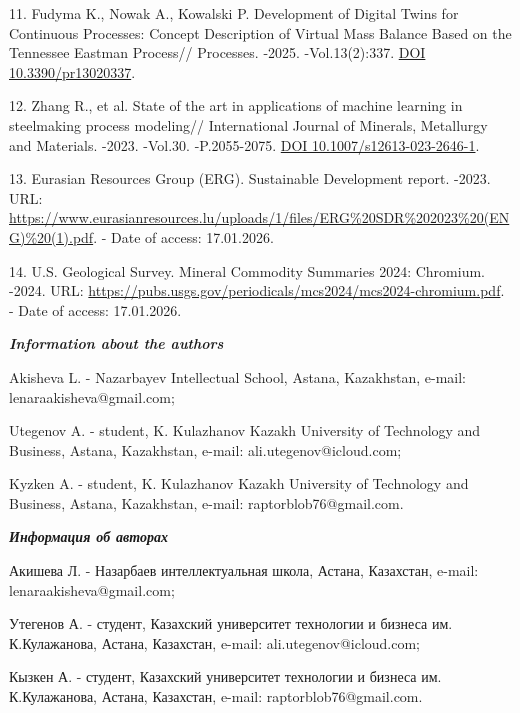 \begin{refs}
11. Fudyma K., Nowak A., Kowalski P. Development of Digital Twins for
Continuous Processes: Concept Description of Virtual Mass Balance Based
on the Tennessee Eastman Process// Processes. -2025. -Vol.13(2):337.
\href{https://doi.org/10.3390/pr13020337}{DOI 10.3390/pr13020337}.

12. Zhang R., et al. State of the art in applications of machine
learning in steelmaking process modeling// International Journal of
Minerals, Metallurgy and Materials. -2023. -Vol.30. -P.2055-2075.
\href{https://doi.org/10.1007/s12613-023-2646-1}{DOI
10.1007/s12613-023-2646-1}.

13. Eurasian Resources Group (ERG). Sustainable Development report.
-2023. URL:
\url{https://www.eurasianresources.lu/uploads/1/files/ERG\%20SDR\%202023\%20(ENG)\%20(1).pdf}.
- Date of access: 17.01.2026.

14. U.S. Geological Survey. Mineral Commodity Summaries 2024: Chromium.
-2024. URL:
\url{https://pubs.usgs.gov/periodicals/mcs2024/mcs2024-chromium.pdf}. -
Date of access: 17.01.2026.
\end{refs}

\begin{info}
\hspace{1em}\emph{{\bfseries Information about the authors}}

Akisheva L. - Nazarbayev Intellectual School, Astana, Kazakhstan,
e-mail: lenaraakisheva@gmail.com;

Utegenov A. - student, K. Kulazhanov Kazakh University of Technology and
Business, Astana, Kazakhstan, e-mail: ali.utegenov@icloud.com;

Kyzken A. - student, K. Kulazhanov Kazakh University of Technology and
Business, Astana, Kazakhstan, e-mail: raptorblob76@gmail.com.

\hspace{1em}\emph{{\bfseries Информация об авторах}}

Акишева Л. - Назарбаев интеллектуальная школа, Астана, Казахстан,
e-mail: lenaraakisheva@gmail.com;

Утегенов А. - студент, Казахский университет технологии и бизнеса им.
К.Кулажанова, Астана, Казахстан, e-mail: ali.utegenov@icloud.com;

Кызкен А. - студент, Казахский университет технологии и бизнеса им.
К.Кулажанова, Астана, Казахстан, e-mail: raptorblob76@gmail.com.
\end{info}
